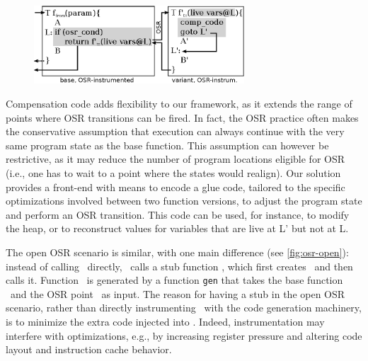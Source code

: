 \ifdefined\noauthorea
\begin{figure}[b]
\begin{center}
\includegraphics[width=0.7\textwidth]{figures/osr-resolved/osr-resolved.eps}
\caption{\protect}
\end{center}
\end{figure}
\fi


Compensation code adds flexibility to our framework, as it extends the range of points where OSR transitions can be fired. In fact, the OSR practice often makes the conservative assumption that execution can always continue with the very same program state as the base function. %
This assumption can however be restrictive, as it may reduce the number of program locations eligible for OSR (i.e., one has to wait to a point where the states would realign). Our solution provides a front-end with means to encode a glue code, tailored to the specific optimizations involved between two function versions, to adjust the program state and perform an OSR transition. This code can be used, for instance, to modify the heap, or to reconstruct values for variables that are live at \textsf{L'} but not at \textsf{L}.

The open OSR scenario is similar, with one main difference (see \myfigure\ref{fig:osr-open}): instead of calling \fosrto\ directly, \fosrfrom\ calls a stub function \fstub, which first creates \fosrto\ and then calls it. Function \fosrto\ is generated by a function {\tt gen} that takes the base function \fbase\ and the OSR point \osrpoint\ as input. The reason for having a stub in the open OSR scenario, rather than directly instrumenting \fbase\ with the code generation machinery, is to minimize the extra code injected into \fbase. Indeed, instrumentation may interfere with optimizations, e.g., by increasing register pressure and altering code layout and instruction cache behavior.

